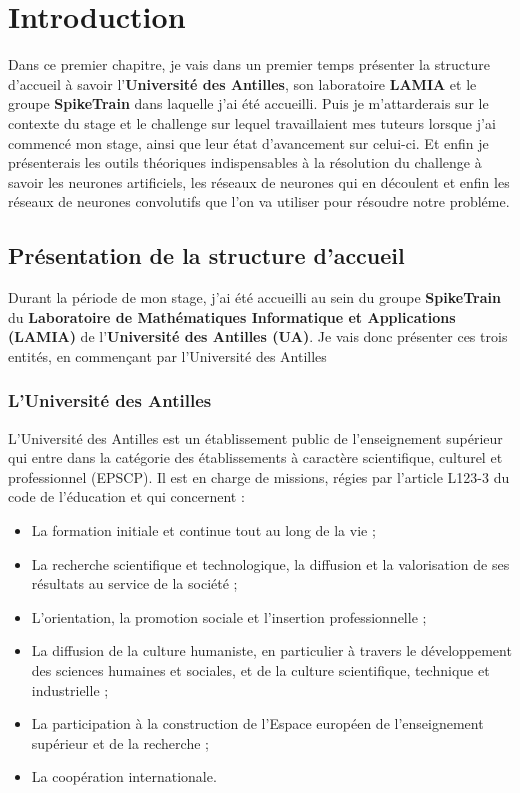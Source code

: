 \hypertarget{Introduction}{%
\chapter{Introduction}\label{Introduction}}

Dans ce premier chapitre, je vais dans un premier temps présenter la structure d'accueil à savoir l'\textbf{Université des Antilles}, son laboratoire \textbf{LAMIA} et le groupe \textbf{SpikeTrain} dans laquelle j'ai été accueilli. Puis je m'attarderais sur le contexte du stage et le challenge sur lequel travaillaient mes tuteurs lorsque j'ai commencé mon stage, ainsi que leur état d'avancement sur celui-ci. Et enfin je présenterais les outils théoriques indispensables à la résolution du challenge à savoir les neurones artificiels, les réseaux de neurones qui en découlent et enfin les réseaux de neurones convolutifs que l'on va utiliser pour résoudre notre probléme.

\section{Présentation de la structure
d'accueil}

Durant la période de mon stage, j'ai été accueilli au sein du groupe \textbf{SpikeTrain} du
\textbf{Laboratoire de Mathématiques Informatique et Applications
(LAMIA)} de l'\textbf{Université des Antilles (UA)}.
Je vais donc présenter ces trois entités, en commençant par l'Université des Antilles

\hypertarget{lUniversite-des-antilles}{%
\subsection{L'Université des Antilles}\label{luniversite-des-antilles}}

L'Université des Antilles est un établissement public de l'enseignement supérieur qui entre dans la catégorie des établissements à  caractère scientifique, culturel et professionnel (EPSCP).
Il est en charge de missions, régies par l'article L123-3 du code de l'éducation et qui concernent :
\begin{itemize}
\item La formation initiale et continue tout au long de la vie ;
\item La recherche scientifique et technologique, la diffusion et la valorisation de ses résultats au service de la société ;
\item L’orientation, la promotion sociale et l’insertion professionnelle ;
\item La diffusion de la culture humaniste, en particulier à travers le développement des sciences humaines et sociales, et de la culture scientifique, technique et industrielle ;
\item La participation à la construction de l’Espace européen de l’enseignement supérieur et de la recherche ;
\item La coopération internationale.
\end{itemize}

